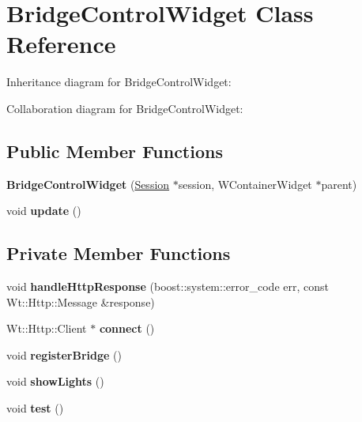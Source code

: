 \hypertarget{classBridgeControlWidget}{}\section{Bridge\+Control\+Widget Class Reference}
\label{classBridgeControlWidget}


Inheritance diagram for Bridge\+Control\+Widget\+:


Collaboration diagram for Bridge\+Control\+Widget\+:
\subsection*{Public Member Functions}
\begin{DoxyCompactItemize}
\item 
{\bfseries Bridge\+Control\+Widget} (\hyperlink{classSession}{Session} $\ast$session, W\+Container\+Widget $\ast$parent)\hypertarget{classBridgeControlWidget_af09e7c2a5993cd307c99ad8c9f964542}{}\label{classBridgeControlWidget_af09e7c2a5993cd307c99ad8c9f964542}

\item 
void {\bfseries update} ()\hypertarget{classBridgeControlWidget_af8533ce9fe9765ff317d9215fb6aa4da}{}\label{classBridgeControlWidget_af8533ce9fe9765ff317d9215fb6aa4da}

\end{DoxyCompactItemize}
\subsection*{Private Member Functions}
\begin{DoxyCompactItemize}
\item 
void {\bfseries handle\+Http\+Response} (boost\+::system\+::error\+\_\+code err, const Wt\+::\+Http\+::\+Message \&response)\hypertarget{classBridgeControlWidget_a894337cd809042fcae667a8caa3f9451}{}\label{classBridgeControlWidget_a894337cd809042fcae667a8caa3f9451}

\item 
Wt\+::\+Http\+::\+Client $\ast$ {\bfseries connect} ()\hypertarget{classBridgeControlWidget_aaab68c6bb33f44c2edeea7942e190ec6}{}\label{classBridgeControlWidget_aaab68c6bb33f44c2edeea7942e190ec6}

\item 
void {\bfseries register\+Bridge} ()\hypertarget{classBridgeControlWidget_a23d4fac71d031ec1c4783af139962754}{}\label{classBridgeControlWidget_a23d4fac71d031ec1c4783af139962754}

\item 
void {\bfseries show\+Lights} ()\hypertarget{classBridgeControlWidget_ae1204ba0a72cf3a6719fda099532f939}{}\label{classBridgeControlWidget_ae1204ba0a72cf3a6719fda099532f939}

\item 
void {\bfseries test} ()\hypertarget{classBridgeControlWidget_a5cabafd79c446bbdd5a75a4eee9b316a}{}\label{classBridgeControlWidget_a5cabafd79c446bbdd5a75a4eee9b316a}

\end{DoxyCompactItemize}
